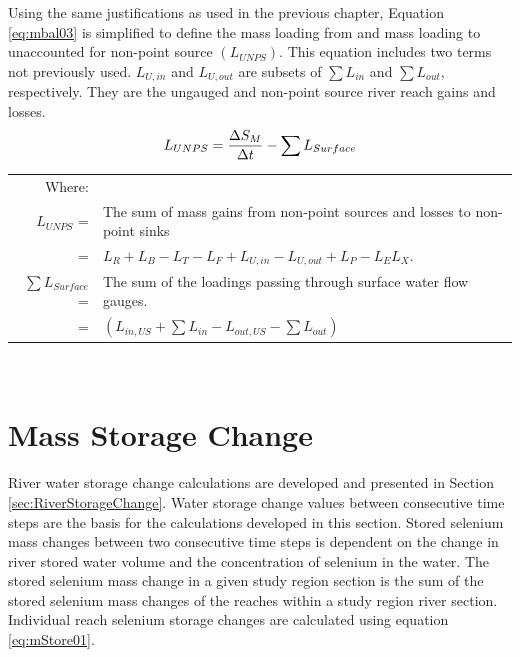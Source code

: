 Using the same justifications as used in the previous chapter, Equation \ref{eq:mbal03} is simplified to define the mass loading from and mass loading to unaccounted for non-point source $\left( L_{UNPS} \right) $.  This equation includes two terms not previously used.  $ L_{U,in} $ and $ L_{U,out} $ are subsets of $\displaystyle \sum L_{in} $ and $ \displaystyle \sum L_{out} $, respectively.  They are the ungauged and non-point source river reach gains and losses.
\begin{equation}
	\label{eq:mbal04}
	L_{UNPS} = \frac{\Delta S_M}{\Delta t} - \sum L_{Surface}\\ 
\end{equation}
\begin{tabular}{r p{5.5in}}
	Where: \\
	$ L_{UNPS} $ = & The sum of mass gains from non-point sources and losses to non-point sinks \\
		= &$ L_R + L_B - L_T -L_ F + L_{U,in} - L_{U,out} + L_P - L_E  L_X$.\\ 
	$ \sum L_{Surface} $ = & The sum of the loadings passing through surface water flow gauges.\\
		= & $ \left( L_{in,US} + \sum L_{in} - L_{out,US} - \sum L_{out} \right)  $\\
\end{tabular}\\

\section{Mass Storage Change}
\label{sec:MassStorageChange}

River water storage change calculations are developed and presented in Section \ref{sec:RiverStorageChange}.  Water storage change values between consecutive time steps are the basis for the calculations developed in this section.  Stored selenium mass changes between two consecutive time steps is dependent on the change in river stored water volume and the concentration of selenium in the water.  The stored selenium mass change in a given study region section is the sum of the stored selenium mass changes of the reaches within a study region river section.  Individual reach selenium storage changes are calculated using equation \ref{eq:mStore01}.

